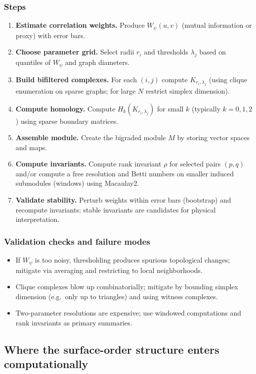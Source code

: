 \documentclass[11pt,oneside]{amsbook}
\numberwithin{equation}{section}
\theoremstyle{plain}
\theoremstyle{definition}
\theoremstyle{remark}
\begin{document}
\subsubsection*{Steps}
\begin{enumerate}
\item \textbf{Estimate correlation weights.} Produce $W_\psi(u,v)$ (mutual information or proxy) with error bars.
\item \textbf{Choose parameter grid.} Select radii $r_i$ and thresholds $\lambda_j$ based on quantiles of $W_\psi$ and graph diameters.
\item \textbf{Build bifiltered complexes.} For each $(i,j)$ compute $K_{r_i,\lambda_j}$ (using clique enumeration on sparse graphs; for large $N$ restrict simplex dimension).
\item \textbf{Compute homology.} Compute $H_k(K_{r_i,\lambda_j})$ for small $k$ (typically $k=0,1,2$) using sparse boundary matrices.
\item \textbf{Assemble module.} Create the bigraded module $M$ by storing vector spaces and maps.
\item \textbf{Compute invariants.} Compute rank invariant $\rho$ for selected pairs $(p,q)$ and/or compute a free resolution and Betti numbers on smaller induced submodules (windows) using Macaulay2.
\item \textbf{Validate stability.} Perturb weights within error bars (bootstrap) and recompute invariants; stable invariants are candidates for physical interpretation.
\end{enumerate}

\subsubsection*{Validation checks and failure modes}
\begin{itemize}
\item If $W_\psi$ is too noisy, thresholding produces spurious topological changes; mitigate via averaging and restricting to local neighborhoods.
\item Clique complexes blow up combinatorially; mitigate by bounding simplex dimension (e.g.\ only up to triangles) and using witness complexes.
\item Two-parameter resolutions are expensive; use windowed computations and rank invariants as primary summaries.
\end{itemize}

\subsection{Where the surface-order structure enters computationally}
\label{sec:where_order_enters}
\end{document}
